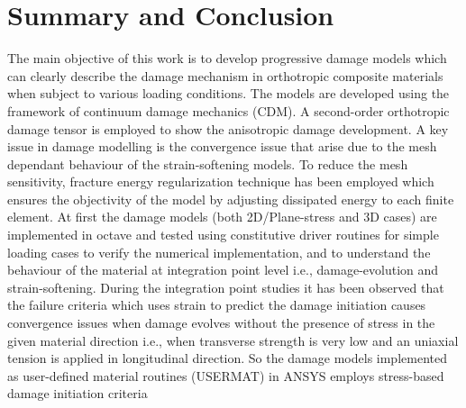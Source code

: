 \documentclass[12pt,a4paper,twoside,openright]{report}
\begin{document}
\newpage
\chapter{Summary and Conclusion}
\indent\indent\indent The main objective of this work is to develop progressive damage models which can clearly describe the damage mechanism in orthotropic composite materials when subject to various loading conditions. The models are developed using the framework of continuum damage mechanics (CDM). A second-order orthotropic damage tensor is employed to show the anisotropic damage development. A key issue in damage modelling is the convergence issue that arise due to the mesh dependant behaviour of the strain-softening models. To reduce the mesh sensitivity, fracture energy regularization technique has been employed which ensures the objectivity of the model by adjusting dissipated energy to each finite element. At first the damage models (both 2D/Plane-stress and 3D cases) are implemented in octave and tested using constitutive driver routines for simple loading cases to verify the numerical implementation, and to understand the behaviour of the material at integration point level i.e., damage-evolution and strain-softening. During the integration point studies it has been observed that the failure criteria which uses strain to predict the damage initiation causes convergence issues when damage evolves without the presence of stress in the given material direction i.e., when transverse strength is very low and an uniaxial tension is applied in longitudinal direction. So the damage models implemented as user-defined material routines (USERMAT) in ANSYS employs stress-based damage initiation criteria\\ 
\end{document}
